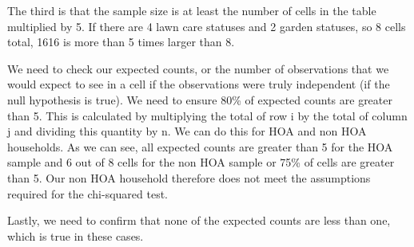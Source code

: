 \documentclass{article}
\begin{document}
The third is that the sample size is at least the number of cells in the table multiplied by 5. If there are 4 lawn care statuses and 2 garden statuses, so 8 cells total, 1616 is more than 5 times larger than 8. 

We need to check our expected counts, or the number of observations that we would expect to see in a cell if the observations were truly independent (if the null hypothesis is true). We need to ensure 80\% of expected counts are greater than 5. This is calculated by multiplying the total of row i by the total of column j and dividing this quantity by n. We can do this for HOA and non HOA households. 
\newline
\newline
{}
As we can see, all expected counts are greater than 5 for the HOA sample and 6 out of 8 cells for the non HOA sample or 75\% of cells are greater than 5. Our non HOA household therefore does not meet the assumptions required for the chi-squared test. 

Lastly, we need to confirm that none of the expected counts are less than one, which is true in these cases. 
\end{document}
